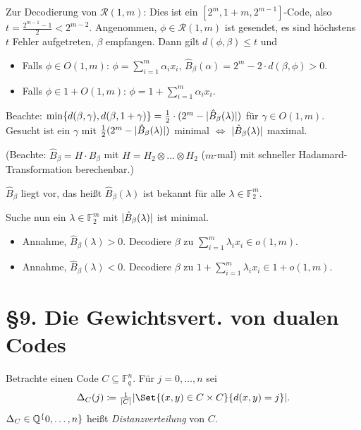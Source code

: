 \documentclass{cheat-sheet}
\newcommand{\F}{\mathbb{F}} %
\newcommand{\RM}{\mathcal{R}} %
\begin{document}
Zur Decodierung von $\RM(1, m)$: Dies ist ein $[2^m, 1+m, 2^{m-1}]$-Code, also $t = \tfrac{2^{m-1} - 1}{2} < 2^{m-2}$.
Angenommen, $\phi \in \RM(1, m)$ ist gesendet, es sind höchstens $t$ Fehler aufgetreten, $\beta$ empfangen.
Dann gilt $d(\phi, \beta) \leq t$ und
\begin{itemize}
  \item Falls $\phi \in O(1, m)$: $\phi = \sum_{i=1}^m \alpha_i x_i$, $\hat{B}_\beta(\alpha) = 2^m - 2 \cdot d(\beta, \phi) > 0$.
  \item Falls $\phi \in 1 + O(1, m)$: $\phi = 1 + \sum_{i=1}^m \alpha_i x_i$.
\end{itemize}

Beachte: $\min \{ d(\beta, \gamma), d(\beta, 1 + \gamma) \} = \tfrac{1}{2} \cdot (2^m - \lvert\hat{B}_\beta(\lambda)\rvert)$ für $\gamma \in O(1, m)$.
Gesucht ist ein $\gamma$ mit $\tfrac{1}{2} (2^m - \lvert\hat{B}_\beta(\lambda)\rvert)$ minimal $\iff$ $\lvert\hat{B}_\beta(\lambda)\rvert$ maximal.

(Beachte: $\hat{B}_\beta = H \cdot B_\beta$ mit $H = H_2 \otimes \ldots \otimes H_2$ ($m$-mal) mit schneller Hadamard-Transformation berechenbar.)

$\hat{B}_\beta$ liegt vor, das heißt $\hat{B}_\beta(\lambda)$ ist bekannt für alle $\lambda \in \F_2^m$.

Suche nun ein $\lambda \in \F_2^m$ mit $\lvert\hat{B}_\beta(\lambda)\rvert$ ist minimal.

\begin{itemize}
  \item Annahme, $\hat{B}_\beta(\lambda) > 0$.
  Decodiere $\beta$ zu $\sum_{i=1}^m \lambda_i x_i \in o(1, m)$.
  \item Annahme, $\hat{B}_\beta(\lambda) < 0$. Decodiere $\beta$ zu $1 + \sum_{i=1}^m \lambda_i x_i \in 1 + o(1, m)$.
\end{itemize}


\section{§9. Die Gewichtsvert. von dualen Codes}


\begin{defn}
  Betrachte einen Code $C \subseteq \F_q^n$.
  Für $j = 0, \ldots, n$ sei
  \[
    \Delta_C(j) \coloneqq \tfrac{1}{\abs{C}} \abs{\Set{(x, y) \in C \times C}{d(x, y) = j}}.
  \]
  $\Delta_C \in \mathbb{Q}^\{0, \ldots, n\}$ heißt \emph{Distanzverteilung} von $C$.
\end{defn}
\end{document}
